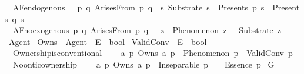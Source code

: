 \begin{isabellebody}
\ \ AF{\isacharunderscore}{\kern0pt}endogenous{\isacharcolon}{\kern0pt}\ \ \ {\isachardoublequoteopen}{\isasymforall}p\ q{\isachardot}{\kern0pt}\ ArisesFrom\ p\ q\ {\isasymlongrightarrow}\ {\isacharparenleft}{\kern0pt}{\isasymexists}s{\isachardot}{\kern0pt}\ Substrate\ s\ {\isasymand}\ Presents\ p\ s\ {\isasymand}\ Presents\ q\ s{\isacharparenright}{\kern0pt}{\isachardoublequoteclose}\ \isanewline
\ \ AF{\isacharunderscore}{\kern0pt}no{\isacharunderscore}{\kern0pt}exogenous{\isacharcolon}{\kern0pt}\ {\isachardoublequoteopen}{\isasymforall}p\ q{\isachardot}{\kern0pt}\ ArisesFrom\ p\ q\ {\isasymlongrightarrow}\ {\isasymnot}\ {\isacharparenleft}{\kern0pt}{\isasymexists}z{\isachardot}{\kern0pt}\ {\isasymnot}\ Phenomenon\ z\ {\isasymand}\ {\isasymnot}\ Substrate\ z{\isacharparenright}{\kern0pt}{\isachardoublequoteclose}%
\isadelimdocument
%
\endisadelimdocument
%
\isatagdocument
%
\isamarkuptrue%
%
\endisatagdocument
{\isafolddocument}%
%
\isadelimdocument
%
\endisadelimdocument
{}\isamarkupfalse%
\ Agent\isanewline
{}\isamarkupfalse%
\ Owns\ {\isacharcolon}{\kern0pt}{\isacharcolon}{\kern0pt}\ {\isachardoublequoteopen}Agent\ {\isasymRightarrow}\ E\ {\isasymRightarrow}\ bool{\isachardoublequoteclose}\isanewline
{}\isamarkupfalse%
\ ValidConv\ {\isacharcolon}{\kern0pt}{\isacharcolon}{\kern0pt}\ {\isachardoublequoteopen}E\ {\isasymRightarrow}\ bool{\isachardoublequoteclose}\isanewline
\isanewline
{}\isamarkupfalse%
\ \isanewline
\ \ Ownership{\isacharunderscore}{\kern0pt}is{\isacharunderscore}{\kern0pt}conventional{\isacharcolon}{\kern0pt}\isanewline
\ \ \ \ {\isachardoublequoteopen}{\isasymforall}a\ p{\isachardot}{\kern0pt}\ Owns\ a\ p\ {\isasymlongrightarrow}\ Phenomenon\ p\ {\isasymand}\ ValidConv\ p{\isachardoublequoteclose}\ \isanewline
\ \ No{\isacharunderscore}{\kern0pt}ontic{\isacharunderscore}{\kern0pt}ownership{\isacharcolon}{\kern0pt}\isanewline
\ \ \ \ {\isachardoublequoteopen}{\isasymforall}a\ p{\isachardot}{\kern0pt}\ Owns\ a\ p\ {\isasymlongrightarrow}\ Inseparable\ p\ {\isasymOmega}\ {\isasymand}\ {\isasymnot}\ Essence\ p{\isachardoublequoteclose}%
\isadelimdocument
%
\endisadelimdocument
%
\isatagdocument
%
\isamarkuptrue%
%
\endisatagdocument
{\isafolddocument}%
%
\isadelimdocument
%
\endisadelimdocument
{}\isamarkupfalse%
\ G\isanewline
{}\isamarkupfalse%

\end{isabellebody}
